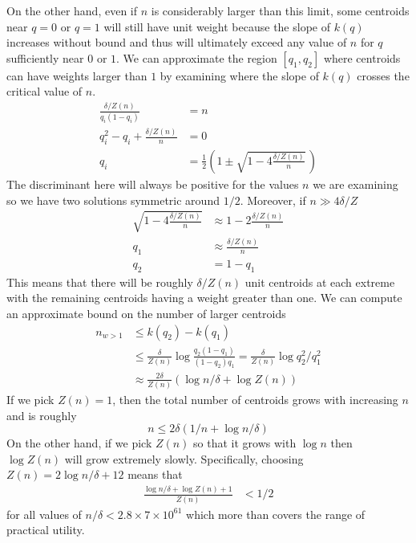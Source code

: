 \documentclass[11pt]{amsart}
\begin{document}
On the other hand, even if $n$ is considerably larger than this limit, some centroids near $q=0$ or $q=1$ will still have unit weight because the slope of $k(q)$ increases without bound and thus will ultimately exceed any value of $n$ for $q$ sufficiently near $0$ or $1$. We can approximate the region $[q_1, q_2]$ where centroids can have weights larger than $1$ by examining where the slope of $k(q)$ crosses the critical value of $n$.
\[
\begin{aligned}
{\frac  {\delta/Z(n)} {q_i (1-q_i) }  } &= n \\
q_i^2 - q_i + \frac {\delta/Z(n)} n &= 0 \\
q_i &= \frac 1 2 \left( { 1 \pm \sqrt { 1 - 4 \frac {\delta/Z(n)} n } } \, \right)
\end{aligned}
\]
The discriminant here will always be positive for the values $n$ we are examining so we have two solutions symmetric around $1/2$. Moreover, if $n \gg 4\delta / Z$
\[
\begin{aligned}
\sqrt { 1 - 4 \frac {\delta/Z(n)} n } &\approx 1 - 2 \frac {\delta / Z(n)} n \\
q_1 &\approx {   \frac {\delta/Z(n)} n  } \,  \\
q_2 &= 1-q_1
\end{aligned}
\]
This means that there will be roughly $\delta/Z(n)$ unit centroids at each extreme with the remaining centroids having a weight greater than one. We can compute an approximate bound on the number of larger centroids
\[
\begin{aligned}
n_{w>1} &\le k(q_2) -k(q_1) \\ 
&\le  \frac \delta {Z(n)} \log {\frac {q_2 (1-q_1)} {(1-q_2) q_1}} = \frac \delta {Z(n)} \log { {q_2^2} / { q_1^2}} \\
&\approx  \frac {2 \delta} {Z(n)} \left(\log  n/ \delta + \log Z(n)\right)
\end{aligned}
\]
If we pick $Z(n) = 1$, then the total number of centroids grows with increasing $n$ and is roughly
\[
n \le 2\delta \left( 1/n + \log n/\delta \right)
\]  
On the other hand, if we pick $Z(n)$ so that it grows with $\log n$ then $\log Z(n)$  will grow extremely slowly. Specifically, choosing $Z(n) = 2 \log n/\delta + 12$ means that 
\[
\begin{aligned}
\frac {\log n / \delta + \log Z(n)+1} {Z(n)}  &< 1/2
\end{aligned}
\]
for all values of $n/\delta < 2.8 \times 7 \times 10^{61}$ which more than covers the range of practical utility.
\end{document}
